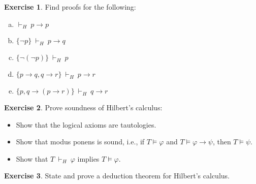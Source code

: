 \documentclass{amsart}
\theoremstyle{definition}
\newtheorem{problem}{Exercise}
\begin{document}
\bigskip

\begin{problem}
Find proofs for the following:
\begin{enumerate}[(a)]
\item $\vdash_H\ p\to p$
\item $\{\neg p\}\ \vdash_H\ p\to q$
\item $\{\neg(\neg p)\}\ \vdash_H\ p$
\item $\{p\to q,q \to r\}\ \vdash_H\ p\to r$
\item $\{p, q \to (p\to r)\}\ \vdash_H\ q\to r$

\end{enumerate}
\end{problem}\medskip


\begin{problem}
Prove soundness of Hilbert's calculus:
\begin{itemize}
    \item Show that the logical axioms are tautologies.
    \item Show that modus ponens is sound, i.e., if $T\models\varphi$ and $T\models\varphi\to\psi$, then $T\models\psi$.
    \item Show that $T\ \vdash_H\ \varphi$ implies $T\models\varphi$.
\end{itemize}
\end{problem}\medskip

\begin{problem}
State and prove a deduction theorem for Hilbert's calculus.
\end{problem}\medskip

\end{document}
